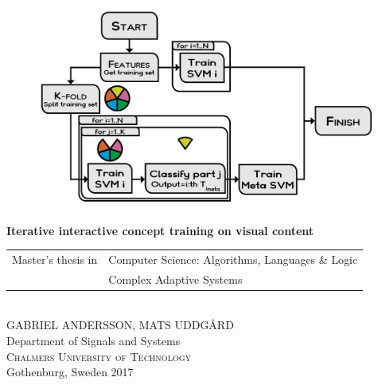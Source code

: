 

\begin{titlepage}
			
\addtolength{\voffset}{2cm}

\begin{figure}[H]
\centering
\vspace{2cm}	%
\includegraphics[width=0.9\linewidth]{figure/train_meta_data.png}
\end{figure}

\mbox{}
\vfill
\renewcommand{\familydefault}{\sfdefault} \normalfont %
\textbf{{\Huge 	Iterative interactive concept training on visual content}} 	\\[0.5cm]
\begin{tabular}{l l}
Master's thesis in 
	& Computer Science: Algorithms, Languages \& Logic \\
	& Complex Adaptive Systems
\end{tabular}\setlength{\parskip}{0.6cm}\\

{\Large GABRIEL ANDERSSON, MATS UDDGÅRD} \setlength{\parskip}{2.6cm}\\

Department of Signals and Systems \\
\textsc{Chalmers University of Technology} \\
Gothenburg, Sweden 2017

\renewcommand{\familydefault}{\rmdefault} \normalfont %
\end{titlepage}


